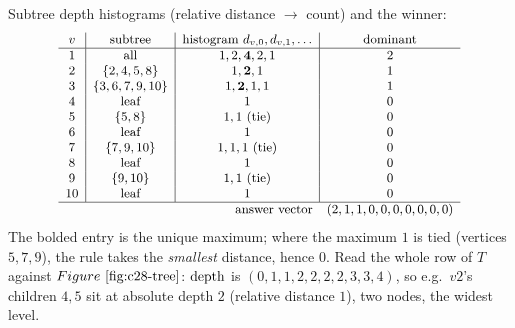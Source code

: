 \begin{tracebox}
Subtree depth histograms (relative distance \(\to\) count) and the winner:
\[
{\small
\begin{array}{c|c|c|c}
v & \text{subtree} & \text{histogram } d_{v,0},d_{v,1},\dots & \text{dominant} \\
\hline
1 & \text{all} & 1,2,\mathbf{4},2,1 & 2 \\
2 & \{2,4,5,8\} & 1,\mathbf{2},1 & 1 \\
3 & \{3,6,7,9,10\} & 1,\mathbf{2},1,1 & 1 \\
4 & \text{leaf} & 1 & 0 \\
5 & \{5,8\} & 1,1\ (\text{tie}) & 0 \\
6 & \text{leaf} & 1 & 0 \\
7 & \{7,9,10\} & 1,1,1\ (\text{tie}) & 0 \\
8 & \text{leaf} & 1 & 0 \\
9 & \{9,10\} & 1,1\ (\text{tie}) & 0 \\
10 & \text{leaf} & 1 & 0 \\
\hline
\multicolumn{3}{r}{\text{answer vector}} & (2,1,1,0,0,0,0,0,0,0)
\end{array}}
\]
The bolded entry is the unique maximum; where the maximum \(1\) is tied
(vertices \(5,7,9\)), the rule takes the \emph{smallest} distance, hence \(0\).
Read the whole row of \(T\) against \(\figref{c28-tree}\): \(\operatorname{depth}\) is
\((0,1,1,2,2,2,2,3,3,4)\), so e.g.\ \(v2\)'s children \(4,5\) sit at absolute
depth \(2\) (relative distance \(1\)), two nodes, the widest level.
\end{tracebox}

